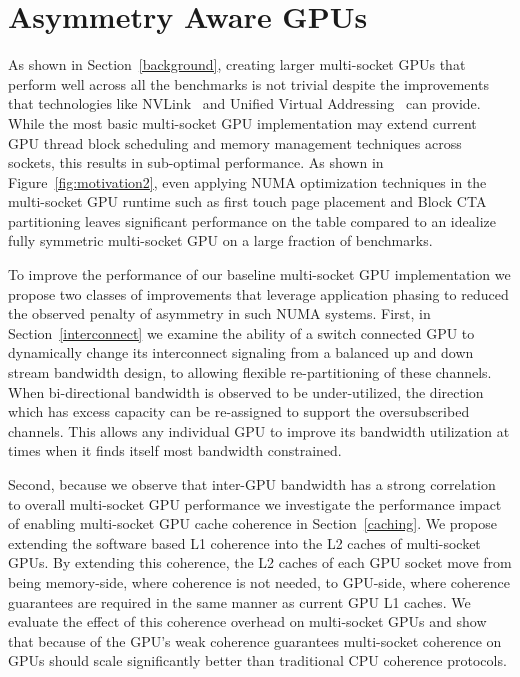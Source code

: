 \section{Asymmetry Aware GPUs}

As shown in Section~\ref{background}, creating larger multi-socket GPUs that 
perform well across all the benchmarks is not trivial despite the 
improvements that technologies like NVLink~\cite{NVLINK} and Unified Virtual 
Addressing~\cite{UVM} can provide. While the most basic multi-socket GPU 
implementation may extend current GPU thread block scheduling and memory 
management techniques across sockets, this results in sub-optimal 
performance.  As shown in Figure~\ref{fig:motivation2}, even applying NUMA 
optimization techniques in the multi-socket GPU runtime such as first touch 
page placement and Block CTA partitioning leaves significant performance on 
the table compared to an idealize fully symmetric multi-socket GPU on a large 
fraction of benchmarks.

To improve the performance of our baseline multi-socket GPU implementation we 
propose two classes of improvements that leverage application phasing to reduced 
the observed penalty of asymmetry in such NUMA systems.  First, in 
Section~\ref{interconnect} we examine the ability of a switch connected GPU to 
dynamically change its interconnect signaling from a balanced up and down 
stream bandwidth design, to allowing flexible re-partitioning of these channels.  
When bi-directional bandwidth is observed to be under-utilized, the direction 
which has excess capacity can be re-assigned to support the oversubscribed 
channels. This allows any individual GPU to improve its bandwidth utilization at 
times when it finds itself most bandwidth constrained.

Second, because we observe that inter-GPU bandwidth has a strong correlation to 
overall multi-socket GPU performance we investigate the performance impact of 
enabling multi-socket GPU cache coherence in Section~\ref{caching}.  We propose 
extending the software based L1 coherence into the L2 caches of multi-socket 
GPUs.  By extending this coherence, the L2 caches of each GPU socket move from 
being memory-side, where coherence is not needed, to GPU-side, where coherence 
guarantees are required in the same manner as current GPU L1 caches.  We 
evaluate the effect of this coherence overhead on multi-socket GPUs and show 
that because of the GPU's weak coherence guarantees multi-socket coherence on 
GPUs should scale significantly better than traditional CPU coherence protocols.

